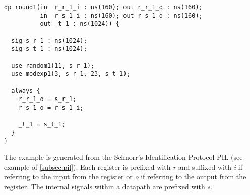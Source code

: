 \filbreak

\begin{lstlisting}[language=GEZEL]
dp round1(in  r_r_1_i : ns(160); out r_r_1_o : ns(160);
          in  r_s_1_i : ns(160); out r_s_1_o : ns(160);
          out _t_1 : ns(1024)) {
          
  sig s_r_1 : ns(1024);
  sig s_t_1 : ns(1024);

  use random1(11, s_r_1);
  use modexp1(3, s_r_1, 23, s_t_1);
  
  always {
    r_r_1_o = s_r_1;
    r_s_1_o = r_s_1_i;

    _t_1 = s_t_1;
  }
}
\end{lstlisting}

The example is generated from the Schnorr's Identification Protocol
PIL (see example of \ref{subsec:pil}). Each register is prefixed with
\emph{r} and suffixed with \emph{i} if referring to the input from the
register or \emph{o} if referring to the output from the register. The
internal signals within a datapath are prefixed with \emph{s}.

